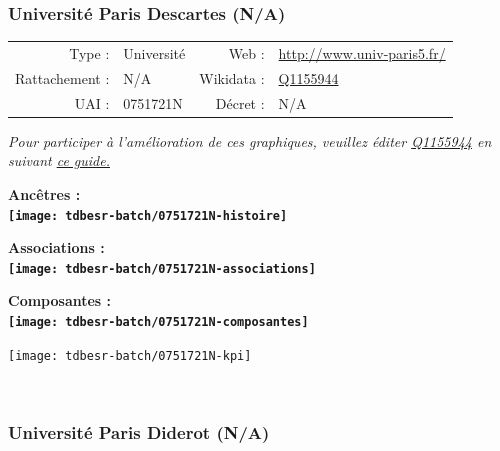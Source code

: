 \documentclass[12pt,french,]{article}
\begin{document}
\hypertarget{universituxe9-paris-descartes-na}{%
\subsubsection{Université Paris Descartes
(N/A)}\label{universituxe9-paris-descartes-na}}

\begin{tabular*}{\textwidth}{rp{5cm}rl}  
\hline  
Type : & Université & Web : &\href{http://www.univ-paris5.fr/}{http://www.univ-paris5.fr/} \\  
Rattachement : & N/A & Wikidata : & \href{https://www.wikidata.org/entity/Q1155944}{Q1155944} \\  
UAI : & 0751721N & Décret : & N/A \\  
\hline  
\end{tabular*}

\textit{\scriptsize Pour participer à l'amélioration de ces graphiques, veuillez éditer  \href{https://www.wikidata.org/entity/Q1155944}{Q1155944}  en suivant \href{https://github.com/cpesr/wikidataESR/blob/master/Rmd/wikidataESR.md}{ce guide.}}

\vspace{1cm}  
\begin{minipage}[b]{0.50\textwidth}\begin{center} \bf Ancêtres : \\  
\texttt{[image: tdbesr-batch/0751721N-histoire]} \end{center}\end{minipage}\begin{minipage}[b]{0.50\textwidth}\begin{center} \bf Associations : \\  
\texttt{[image: tdbesr-batch/0751721N-associations]} \end{center}\end{minipage}

\hrulefill

\begin{center} \bf Composantes : \\  
\texttt{[image: tdbesr-batch/0751721N-composantes]} \end{center}

\begin{center}\texttt{[image: tdbesr-batch/0751721N-kpi]} \end{center}\checkoddpage

\ifoddpage ~\newpage \fi   

\hypertarget{universituxe9-paris-diderot-na}{%
\subsubsection{Université Paris Diderot
(N/A)}\label{universituxe9-paris-diderot-na}}
\end{document}
